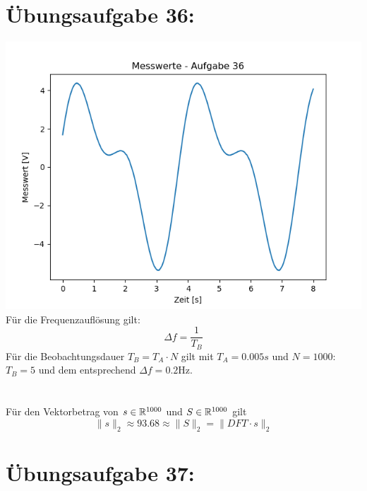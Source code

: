 	\section*{Übungsaufgabe 36:}
		\includegraphics[width = \textwidth]{A36_Zeit-App-Plot.png}
		Für die Frequenzauflösung gilt:
		$$\Delta f = \frac{1}{T_B}$$
		Für die Beobachtungsdauer $T_B = T_A\cdot N$ gilt mit $T_A = 0.005s$ und $N = 1000$: $T_B = 5$ und dem entsprechend $\Delta f = 0.2\text{Hz}$.\\
		\\
		\\
		Für den Vektorbetrag von $s\in{\mathbb R}^{1000}$ und $S\in{\mathbb R}^{1000}$ gilt 
		$$\|s\|_{2} \approx 93.68 \approx \|S\|_2 = \|DFT\cdot s\|_2$$
\newpage
	\section*{Übungsaufgabe 37:}

